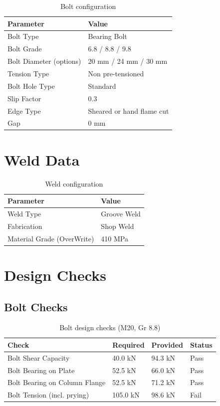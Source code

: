 \documentclass[12pt]{article}
\begin{document}
\begin{table}[h]
\centering
\caption{Bolt configuration}
\label{tab:bolt-data}
\begin{tabular}{ll}
Parameter & Value \\ \hline
Bolt Type & Bearing Bolt \\
\hline
Bolt Grade & 6.8 / 8.8 / 9.8 \\
\hline
Bolt Diameter (options) & 20 mm / 24 mm / 30 mm \\
\hline
Tension Type & Non pre-tensioned \\
\hline
Bolt Hole Type & Standard \\
\hline
Slip Factor & 0.3 \\
\hline
Edge Type & Sheared or hand flame cut \\
\hline
Gap & 0 mm \\
\hline
\end{tabular}
\end{table}

\FloatBarrier

\section{Weld Data}

\begin{table}[h]
\centering
\caption{Weld configuration}
\label{tab:weld-data}
\begin{tabular}{ll}
Parameter & Value \\ \hline
Weld Type & Groove Weld \\
\hline
Fabrication & Shop Weld \\
\hline
Material Grade (OverWrite) & 410 MPa \\
\hline
\end{tabular}
\end{table}

\FloatBarrier

\section{Design Checks}

\FloatBarrier

\subsection{Bolt Checks}

\begin{table}[h]
\centering
\caption{Bolt design checks (M20, Gr 8.8)}
\label{tab:bolt-checks}
\begin{tabular}{llll}
Check & Required & Provided & Status \\ \hline
Bolt Shear Capacity & 40.0 kN & 94.3 kN & Pass \\
\hline
Bolt Bearing on Plate & 52.5 kN & 66.0 kN & Pass \\
\hline
Bolt Bearing on Column Flange & 52.5 kN & 71.2 kN & Pass \\
\hline
Bolt Tension (incl. prying) & 105.0 kN & 98.6 kN & Fail \\
\hline
\end{tabular}
\end{table}
\end{document}
